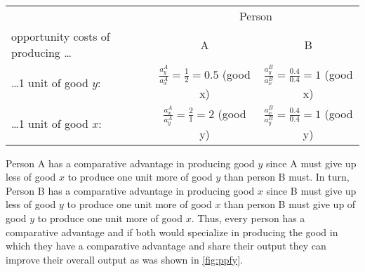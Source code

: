 {	\begin{center}
		\begin{tabular}{lcc}\toprule
			&\multicolumn{2}{c}{Person}\\\cmidrule{2-3}
			opportunity costs of producing \dots	&A &B\\		\midrule
			\dots1 unit of good $y$: & $\frac{a_y^A}{a_x^A}=\frac{1}{2}=0.5$  (good x) & $\frac{a_y^B}{a_x^B}=\frac{0.4}{0.4}=1$ (good x) \\
			\dots1 unit of good $x$: & $\frac{a_x^A}{a_y^A}=\frac{2}{1}=2$  (good y) & $\frac{a_x^B}{a_y^B}=\frac{0.4}{0.4}=1$  (good y) \\\bottomrule
		\end{tabular}
	\end{center}\medskip
	
Person A has a comparative advantage in producing good $y$ since A must give up less of good $x$ to produce one unit more of good $y$ than person B must. 
In turn, Person B has a comparative advantage in producing good $x$ since B must give up less of good $y$ to produce one unit more of good $x$ than person B must give up of good $y$ to produce one unit more of good $x$. 
Thus, every person has a comparative advantage and if both would specialize in producing the good in which they have a comparative advantage and share their output they can improve their overall output as was shown in \autoref{fig:ppfy}. 


%	
	
%	
	
}
